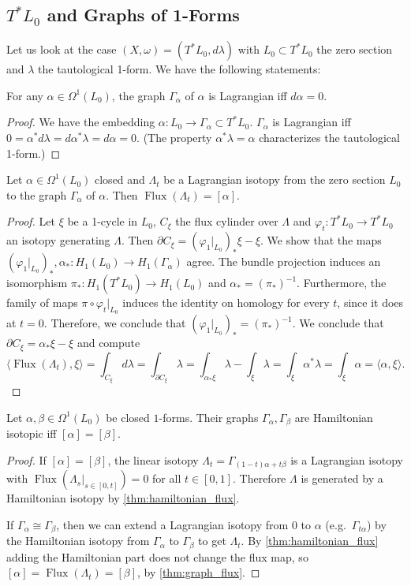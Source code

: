 \documentclass[12pt,a4paper,draft]{scrartcl}
\DeclareMathOperator{\Flux}{Flux}
\begin{document}
\subsection{\texorpdfstring{$T^* L_0$}{T*L} and Graphs of 1-Forms} 

Let us look at the case $(X,ω)=(T^* L_0,d λ)$ with $L_0 ⊂ T^* L_0$ the zero section and $λ$ the tautological 1-form.
We have the following statements:

\begin{lemma}
  \label{thm:graph_lagrangian}
  For any $α ∈ Ω^1(L_0)$, the graph $Γ_α$ of $α$ is Lagrangian iff $d α=0$.
\end{lemma}
\begin{proof}
  We have the embedding $α \colon L_0 → Γ_α ⊂ T^* L_0$. $Γ_α$ is Lagrangian iff $0 = α^* d λ = d α^* λ = d α = 0$. (The property $α^* λ = α$ characterizes the tautological 1-form.)
\end{proof}

\begin{lemma}
  \label{thm:graph_flux}
  Let $α ∈ Ω^1(L_0)$ closed and $Λ_t$ be a Lagrangian isotopy from the zero section $L_0$ to the graph $Γ_α$ of $α$. Then $\Flux(Λ_t) = [α]$.
\end{lemma}
\begin{proof}
  Let $ξ$ be a 1-cycle in $L_0$, $C_ξ$ the flux cylinder over $Λ$ and $\varphi_t \colon T^*L_0 \rightarrow T^*L_0$ an isotopy generating $\Lambda$. Then $∂C_ξ = (\varphi_1\vert_{L_0})_* ξ - ξ$. We show that the maps $(\varphi_1\vert_{L_0})_*, \alpha_* \colon H_1(L_0) \rightarrow H_1(\Gamma_{\alpha})$ agree.
The bundle projection induces an isomorphism $\pi_* \colon H_1(T^*L_0) \rightarrow H_1(L_0)$ and $\alpha_* = (\pi_*)^{-1}$. Furthermore, the family of maps $\pi \circ \varphi_t\vert_{L_0}$ induces the identity on homology for every $t$, since it does at $t=0$. Therefore, we conclude that $(\varphi_1\vert_{L_0})_* = (\pi_*)^{-1}$. We conclude that $∂C_ξ = α_* ξ - ξ$ and compute
  \[⟨\Flux(Λ_t),ξ ⟩ = ∫_{C_ξ} dλ = ∫_{∂C_ξ} λ = ∫_{α_* ξ}λ - ∫_{ξ} λ = ∫_{ξ} α^* λ = ∫_{ξ} α = ⟨α,ξ⟩ .\]
\end{proof}

\begin{lemma}
  \label{thm:graph_hamiltonian_isotopic}
  Let $\alpha,\beta \in  \Omega^1(L_0)$ be closed $1$-forms.
Their graphs $\Gamma_{\alpha}, \Gamma_{\beta}$ are Hamiltonian isotopic iff $[\alpha] = [\beta]$.
\end{lemma}
\begin{proof}
If $[\alpha] = [\beta]$, the linear isotopy $\Lambda_t = Γ_{(1-t)α + t β}$ is a Lagrangian isotopy with $\Flux(Λ_s|_{s ∈ [0,t]}) = 0$ for all $t \in [0,1]$. Therefore $\Lambda$ is generated by a Hamiltonian isotopy by \cref{thm:hamiltonian_flux}.

  If $Γ_α ≅ Γ_β$, then we can extend a Lagrangian isotopy from $0$ to $α$ (e.g.\ $Γ_{tα}$) by the Hamiltonian isotopy from $Γ_α$ to $Γ_β$ to get $Λ_t$. By \cref{thm:hamiltonian_flux} adding the Hamiltonian part does not change the flux map, so $[α] = \Flux(Λ_t) = [β]$, by \cref{thm:graph_flux}.
\end{proof}
\end{document}
